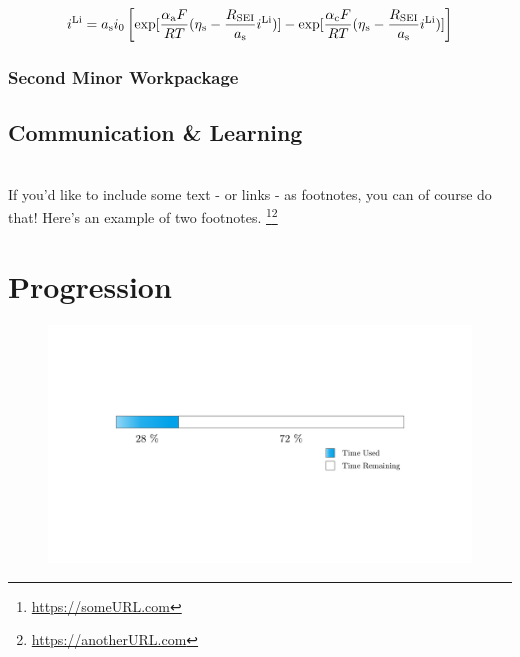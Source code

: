 \documentclass[pdftex,12pt,a4paper]{article}
\begin{document}
\begin{equation}\label{eq:BV}
i\textsuperscript{Li} = a\textsubscript{s}i\textsubscript{0} \left[\exp[\frac{\alpha\textsubscript{a}F}{RT}(\eta\textsubscript{s}-\frac{R\textsubscript{SEI}}{a\textsubscript{s}}i\textsuperscript{Li})] - \exp[\frac{\alpha\textsubscript{c}F}{RT}(\eta\textsubscript{s}-\frac{R\textsubscript{SEI}}{a\textsubscript{s}}i\textsuperscript{Li})]\right]
\end{equation}

\bigskip

\subsubsection{Second Minor Workpackage} \label{sec:Name for 2nd subsection of work package 2}
\blindtext		%

\subsection{Communication \& Learning}
\blindtext \\		%

If you'd like to include some text - or links - as footnotes, you can of course do that! Here's an example of two footnotes. \footnote{\url{https://someURL.com}}\footnote{\url{https://anotherURL.com}}

\clearpage %

\section{\textbf{Progression}}

\begin{figure}[h]	%
	\centering
	\includegraphics[scale=0.4]{Images/progress_bar}
	\label{fig:Progess_Bar}	%
\end{figure}
\end{document}

